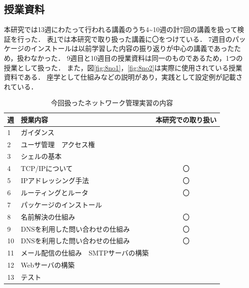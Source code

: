 \documentclass[12pt,a4j,titlepage]{ltjsarticle}
\begin{document}
\subsection{授業資料}
本研究では13週にわたって行われる講義のうち4\textasciitilde10週の計7回の講義を扱って検証を行った．
表\ref{tb:kougi2}では本研究で取り扱った講義に〇をつけている．
7週目のパッケージのインストールは以前学習した内容の振り返りが中心の講義であったため，扱わなかった．
9週目と10週目の授業資料は同一のものであるため，1つの授業として扱った．
また，図\ref{fig:8no1}，\ref{fig:8no2}は実際に使用されている授業資料である．
座学として仕組みなどの説明があり，実践として設定例が記載されている．

\begin{table}[htbp]
  \caption{今回扱ったネットワーク管理実習の内容}
  \begin{center}
\begin{tabular}{llc}\hline
               週 & 授業内容 & 本研究での取り扱い\\ \hline
               1 & ガイダンス & \\
               2 & ユーザ管理　アクセス権 & \\
               3 & シェルの基本 & \\
               4 & TCP/IPについて & 〇\\
               5 & IPアドレッシング手法 & 〇\\
               6 & ルーティングとルータ & 〇\\
               7 & パッケージのインストール & \\
               8 & 名前解決の仕組み & 〇\\
               9 & DNSを利用した問い合わせの仕組み & 〇\\
              10 & DNSを利用した問い合わせの仕組み & 〇\\
              11 & メール配信の仕組み　SMTPサーバの構築 & \\
              12 & Webサーバの構築 & \\
              13 & テスト & \\
              \hline
               \end{tabular}
               \end{center}
               \label{tb:kougi2}
               \end{table}

\clearpage
\end{document}
